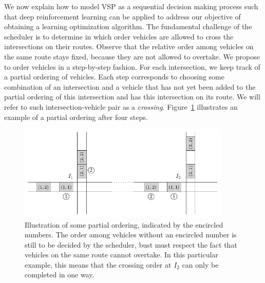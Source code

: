 \documentclass{article}
\theoremstyle{definition}
\theoremstyle{plain}
\begin{document}
We now explain how to model VSP as a sequential decision making process such
that deep reinforcement learning can be applied to address our objective of
obtaining a learning optimization algorithm.
The fundamental challenge of the scheduler is to determine in which order
vehicles are allowed to cross the intersections on their routes. Observe that
the relative order among vehicles on the same route stays fixed, because they
are not allowed to overtake.
%
We propose to order vehicles in a step-by-step fashion. For each intersection,
we keep track of a partial ordering of vehicles. Each step corresponds to
choosing some combination of an intersection and a vehicle that has not yet been
added to the partial ordering of this intersection and has this intersection on
its route. We will refer to such intersection-vehicle pair as a \textit{crossing}.
Figure~\ref{fig:network_ordering} illustrates an example of a partial ordering after four steps.

\begin{figure}[h]
  \centering
  \includegraphics[width=0.9\textwidth]{figures/network_ordering.pdf}
  \caption{Illustration of some partial ordering, indicated by the encircled
    numbers. The order among vehicles without an encircled number is still to be
    decided by the scheduler, bust must respect the fact that vehicles on the
    same route cannot overtake. In this particular example, this means that the
    crossing order at $I_{2}$ can only be completed in one way.}
  \label{fig:network_ordering}
\end{figure}
\end{document}
